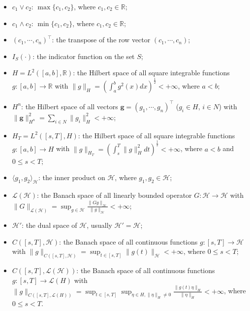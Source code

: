 \documentclass[10pt]{article}
\begin{document}
    \begin{itemize}

\item     $c_1\vee c_2$: $\max\{c_1,c_2\}$, where $c_1,c_2\in \mathbb{R}$;

 \item       $c_1\wedge c_2$: $\min\{c_1,c_2\}$, where $c_1,c_2\in \mathbb{R}$;

   \item          $(c_1,\cdots,c_n)^{\top}$:   the transpose of the row vector $(c_1,\cdots,c_n)$;

   \item        $I_{S}(\cdot)$: the indicator function on the set $S$;

    \item       $H=L^2([a,b],\mathbb{R})$: the Hilbert space of all square integrable functions $g:[a,b]\rightarrow\mathbb{R}$ with $\|g\|_H=(\int_a^bg^2(x)dx)^{\frac{1}{2}}<+\infty$, where  $a<b$;

\item      $H^n$: the Hilbert space of all  vectors $\mathbf{g}=(g_1,\cdots,g_n)^{\top}$ ($g_i\in H$, $i\in N$) with $\|\mathbf{g}\|_{H^n}^2=\sum_{i\in N}\|g_i\|^2_H<+\infty$;

     \item  $H_T=L^2([s,T],H)$: the Hilbert space of all square integrable functions $g:[a,b]\rightarrow H$ with $\|g\|_{H_T}=(\int_s^T\|g\|^2_Hdt)^{\frac{1}{2}}<+\infty$, where  $a<b$
           and $0\leq s<T$;


 \item     $\langle g_1,g_2\rangle_\mathcal{H}$: the inner product on $\mathcal{H}$, where $g_1,g_2\in \mathcal{H}$;

  \item    $\mathcal{L}(\mathcal{H})$: the Banach space of all linearly bounded operator $G:\mathcal{H}\rightarrow \mathcal{H}$  with $\|G\|_{\mathcal{L}(\mathcal{H})}=\sup_{g\in \mathcal{H}}\frac{\|Gg\|_\mathcal{H}}{\|g\|_\mathcal{H}}<+\infty$;

  \item    $\mathcal{H}'$: the dual space of $\mathcal{H}$, usually $\mathcal{H}'=\mathcal{H}$;

 \item     $C([s,T],\mathcal{H})$: the Banach space of all continuous functions $g:[s,T]\rightarrow \mathcal{H}$ with 
$\|g\|_{C([s,T],\mathcal{H})}=\sup_{t\in[s,T]}\|g(t)\|_{\mathcal{H}}<+\infty$, where $0\leq s<T$;

\item   $C([s,T],\mathcal{L}({\mathcal{H}}))$: the Banach space of all continuous functions $g:[s,T]\rightarrow \mathcal{L}({H})$  with 
$\|g\|_{C([s,T],\mathcal{L}({H}))}=\sup_{t\in[s,T]}\sup_{\eta\in H,\|\eta\|_H\neq0}\frac{\|g(t)\eta\|_H}{\|\eta\|_H}<+\infty$, where $0\leq s<T$. 
\end{itemize}
\end{document}
